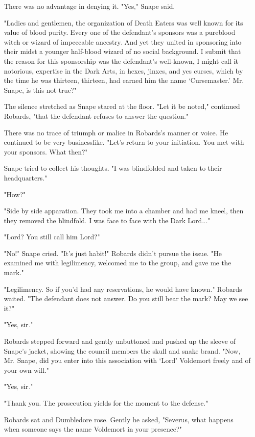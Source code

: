 \documentclass[a4paper,11pt]{article}
\begin{document}
There was no advantage in denying it. "Yes," Snape said.

"Ladies and gentlemen, the organization of Death Eaters was well known for its value of blood purity. Every one of the defendant's sponsors was a pureblood witch or wizard of impeccable ancestry. And yet they united in sponsoring into their midst a younger half-blood wizard of no social background. I submit that the reason for this sponsorship was the defendant's well-known, I might call it notorious, expertise in the Dark Arts, in hexes, jinxes, and yes curses, which by the time he was thirteen, thirteen, had earned him the name `Cursemaster.' Mr. Snape, is this not true?"

The silence stretched as Snape stared at the floor. "Let it be noted," continued Robards, "that the defendant refuses to answer the question."

There was no trace of triumph or malice in Robards's manner or voice. He continued to be very businesslike. "Let's return to your initiation. You met with your sponsors. What then?"

Snape tried to collect his thoughts. "I was blindfolded and taken to their headquarters."

"How?"

"Side by side apparation. They took me into a chamber and had me kneel, then they removed the blindfold. I was face to face with the Dark Lord..."

"Lord? You still call him Lord?"

"No!" Snape cried. "It's just habit!" Robards didn't pursue the issue. "He examined me with legilimency, welcomed me to the group, and gave me the mark."

"Legilimency. So if you'd had any reservations, he would have known." Robards waited. "The defendant does not answer. Do you still bear the mark? May we see it?"

"Yes, sir."

Robards stepped forward and gently unbuttoned and pushed up the sleeve of Snape's jacket, showing the council members the skull and snake brand. "Now, Mr. Snape, did you enter into this association with `Lord' Voldemort freely and of your own will."

"Yes, sir."

"Thank you. The prosecution yields for the moment to the defense."

Robards sat and Dumbledore rose. Gently he asked, "Severus, what happens when someone says the name Voldemort in your presence?"
\end{document}
